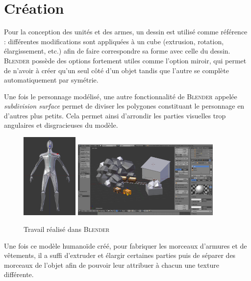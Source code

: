 \documentclass[12pt]{report}
\begin{document}
\section{Création}

Pour la conception des unités et des armes, un dessin est utilisé comme
référence : différentes modifications sont appliquées à un cube (extrusion,
rotation, élargissement, etc.) afin de faire correspondre sa forme avec celle du
dessin. \textsc{Blender} possède des options fortement utiles comme l’option
miroir, qui permet de n’avoir à créer qu’un seul côté d’un objet tandis que
l’autre se complète automatiquement par symétrie.

Une fois le personnage modélisé, une autre fonctionnalité de \textsc{Blender}
appelée \textit{subdivision surface} permet de diviser les polygones constituant
le personnage en d’autres plus petits. Cela permet ainsi d’arrondir les parties
visuelles trop angulaires et disgracieuses du modèle.

\begin{figure}[H]
    \centering
    \includegraphics[width=0.25\textwidth]{../report_1/img/unit_armature}
    \includegraphics[width=0.65\textwidth]{blender}
    \caption*{Travail réalisé dans \textsc{Blender}}
\end{figure}

Une fois ce modèle humanoïde créé, pour fabriquer les morceaux d’armures et de
vêtements, il a suffi d’extruder et élargir certaines parties puis de séparer
des morceaux de l’objet afin de pouvoir leur attribuer à chacun une texture
différente. 
\end{document}
